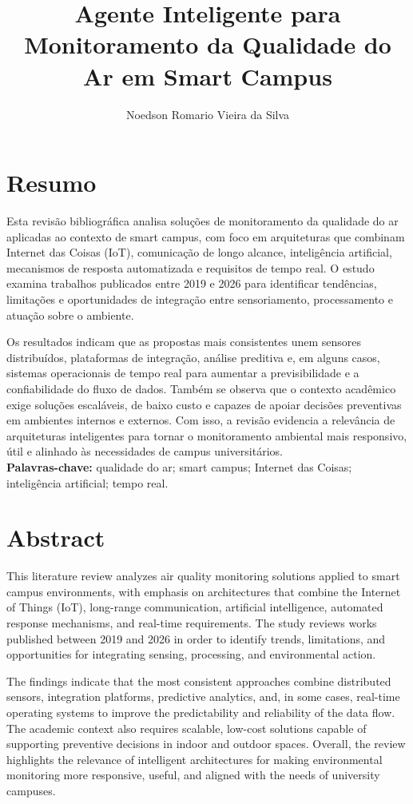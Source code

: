 \documentclass[12pt,a4paper]{article}
\title{Agente Inteligente para Monitoramento da Qualidade do Ar em Smart Campus}
\author{Noedson Romario Vieira da Silva}
\date{}
\begin{document}
\maketitle

\section*{Resumo}
Esta revisão bibliográfica analisa soluções de monitoramento da qualidade do ar aplicadas ao contexto de smart campus, com foco em 
arquiteturas que combinam Internet das Coisas (IoT), comunicação de longo alcance, inteligência artificial, mecanismos de resposta 
automatizada e requisitos de tempo real. O estudo examina trabalhos publicados entre 2019 e 2026 para identificar tendências, 
limitações e oportunidades de integração entre sensoriamento, processamento e atuação sobre o ambiente.

Os resultados indicam que as propostas mais consistentes unem sensores distribuídos, plataformas de integração, análise 
preditiva e, em alguns casos, sistemas operacionais de tempo real para aumentar a previsibilidade e a confiabilidade do fluxo de dados. 
Também se observa que o contexto acadêmico exige soluções escaláveis, de baixo custo e capazes de apoiar decisões preventivas em ambientes
 internos e externos. Com isso, a revisão evidencia a relevância de arquiteturas inteligentes para tornar o monitoramento ambiental 
 mais responsivo, útil e alinhado às necessidades de campus universitários.\\

\textbf{Palavras-chave:} qualidade do ar; smart campus; Internet das Coisas; inteligência artificial; tempo real.

\section*{Abstract}
This literature review analyzes air quality monitoring solutions applied to smart campus environments, with emphasis on 
architectures that combine the Internet of Things (IoT), long-range communication, artificial intelligence, automated response 
mechanisms, and real-time requirements. The study reviews works published between 2019 and 2026 in order to identify trends, 
limitations, and opportunities for integrating sensing, processing, and environmental action.

The findings indicate that the most consistent approaches combine distributed sensors, integration platforms, 
predictive analytics, and, in some cases, real-time operating systems to improve the predictability and reliability 
of the data flow. The academic context also requires scalable, low-cost solutions capable of supporting preventive 
decisions in indoor and outdoor spaces. Overall, the review highlights the relevance of intelligent architectures for 
making environmental monitoring more responsive, useful, and aligned with the needs of university campuses.\\
\end{document}
